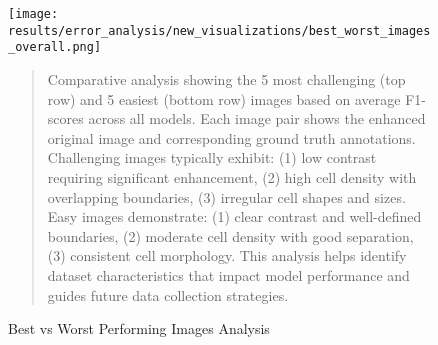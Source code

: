 \begin{figure}[htbp]
\centering
\texttt{[image: results/error\_analysis/new\_visualizations/best\_worst\_images\_overall.png]}
\caption{Best vs Worst Performing Images Analysis}
\label{fig:best_worst_analysis}
\begin{quote}
\small
Comparative analysis showing the 5 most challenging (top row) and 5 easiest (bottom row) images based on average F1-scores across all models. Each image pair shows the enhanced original image and corresponding ground truth annotations. Challenging images typically exhibit: (1) low contrast requiring significant enhancement, (2) high cell density with overlapping boundaries, (3) irregular cell shapes and sizes. Easy images demonstrate: (1) clear contrast and well-defined boundaries, (2) moderate cell density with good separation, (3) consistent cell morphology. This analysis helps identify dataset characteristics that impact model performance and guides future data collection strategies.
\end{quote}
\end{figure}
